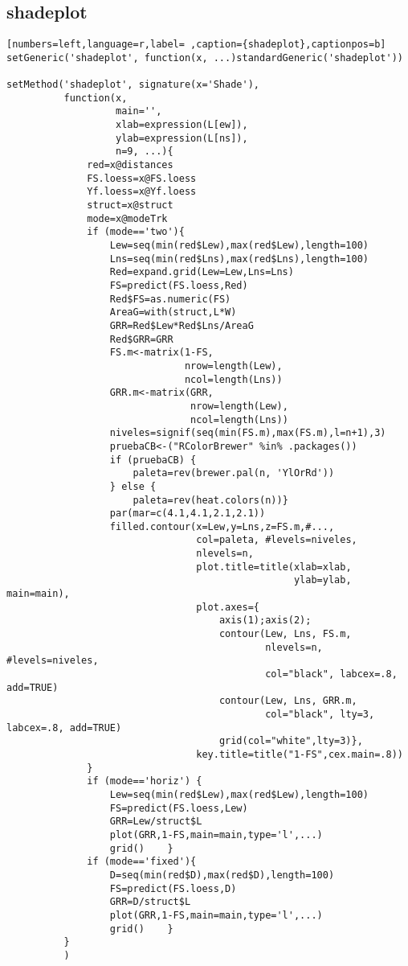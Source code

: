 \subsection{shadeplot}
\label{sec:org83161e4}
\begin{lstlisting}[numbers=left,language=r,label= ,caption={shadeplot},captionpos=b]
setGeneric('shadeplot', function(x, ...)standardGeneric('shadeplot'))

setMethod('shadeplot', signature(x='Shade'),
          function(x,
                   main='',
                   xlab=expression(L[ew]),
                   ylab=expression(L[ns]),
                   n=9, ...){
              red=x@distances
              FS.loess=x@FS.loess
              Yf.loess=x@Yf.loess
              struct=x@struct
              mode=x@modeTrk
              if (mode=='two'){
                  Lew=seq(min(red$Lew),max(red$Lew),length=100)
                  Lns=seq(min(red$Lns),max(red$Lns),length=100)
                  Red=expand.grid(Lew=Lew,Lns=Lns)
                  FS=predict(FS.loess,Red)
                  Red$FS=as.numeric(FS)
                  AreaG=with(struct,L*W)
                  GRR=Red$Lew*Red$Lns/AreaG
                  Red$GRR=GRR
                  FS.m<-matrix(1-FS,
                               nrow=length(Lew),
                               ncol=length(Lns))
                  GRR.m<-matrix(GRR,
                                nrow=length(Lew),
                                ncol=length(Lns))
                  niveles=signif(seq(min(FS.m),max(FS.m),l=n+1),3)
                  pruebaCB<-("RColorBrewer" %in% .packages())
                  if (pruebaCB) {
                      paleta=rev(brewer.pal(n, 'YlOrRd'))
                  } else {
                      paleta=rev(heat.colors(n))}
                  par(mar=c(4.1,4.1,2.1,2.1)) 
                  filled.contour(x=Lew,y=Lns,z=FS.m,#...,
                                 col=paleta, #levels=niveles,
                                 nlevels=n,
                                 plot.title=title(xlab=xlab,
                                                  ylab=ylab, main=main),
                                 plot.axes={
                                     axis(1);axis(2);
                                     contour(Lew, Lns, FS.m,
                                             nlevels=n, #levels=niveles,
                                             col="black", labcex=.8,  add=TRUE)
                                     contour(Lew, Lns, GRR.m,
                                             col="black", lty=3, labcex=.8, add=TRUE)
                                     grid(col="white",lty=3)},
                                 key.title=title("1-FS",cex.main=.8))
              }
              if (mode=='horiz') {
                  Lew=seq(min(red$Lew),max(red$Lew),length=100)
                  FS=predict(FS.loess,Lew)
                  GRR=Lew/struct$L
                  plot(GRR,1-FS,main=main,type='l',...)
                  grid()    }
              if (mode=='fixed'){
                  D=seq(min(red$D),max(red$D),length=100)
                  FS=predict(FS.loess,D)
                  GRR=D/struct$L
                  plot(GRR,1-FS,main=main,type='l',...)
                  grid()    }
          }
          )
\end{lstlisting}
